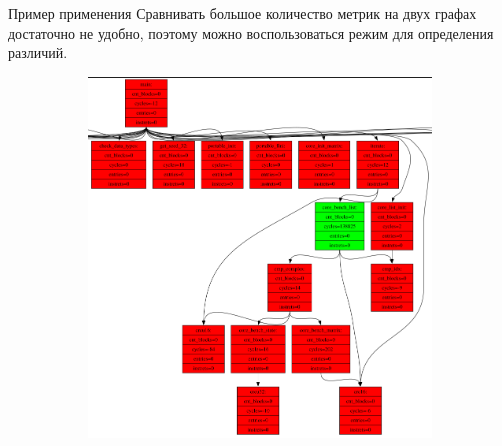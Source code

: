 \documentclass[10pt,aspectratio=169,hyperref={pdftex,unicode},xcolor=dvipsnames]{beamer}
\begin{document}
\begin{frame}{ Пример применения }
    Сравнивать большое количество метрик на двух графах достаточно
    не удобно, поэтому можно воспользоваться режим для определения различий.



    \pause
    \begin{figure}
        \begin{subfigure}{0.45\textwidth}
            \centering
            \includegraphics[height=0.7\textheight,keepaspectratio]{./images/stacd_diff.png}
        \end{subfigure}
        \begin{subfigure}{0.45\textwidth}
            \centering
\end{subfigure}
\end{figure}
\end{frame}
\end{document}
